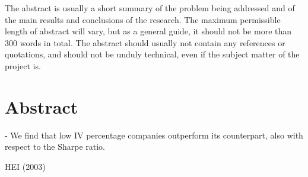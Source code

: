 The abstract is usually a short summary of the problem being addressed and of the main results and conclusions of the research. The maximum permissible length of abstract will vary, but as a general guide, it should not be more than 300 words in total. The abstract should usually not contain any references or quotations, and should not be unduly technical, even if the subject matter of the project is.

\chapter{Abstract}

- We find that low IV percentage companies outperform its counterpart, also with respect to the Sharpe ratio. 


HEI (2003) \cite{latexcompanion}